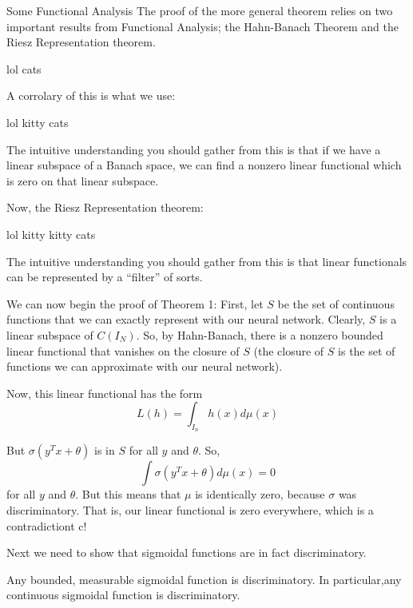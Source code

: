 \documentclass[11pt,letterpaper]{beamer}
\begin{document}
\begin{frame}{Some Functional Analysis}
  The proof of the more general theorem relies on two important results from
  Functional Analysis; the Hahn-Banach Theorem and the Riesz Representation
  theorem.

  \begin{theorem}
    lol cats 
  \end{theorem}
  A corrolary of this is what we use:

  \begin{theorem}
    lol kitty cats
  \end{theorem}

  The intuitive understanding you should gather from this is that if we have a
  linear subspace of a Banach space, we can find a nonzero linear functional which is
  zero on that linear subspace.
\end{frame}

\begin{frame}
  Now, the Riesz Representation theorem:
  \begin{theorem}
    lol kitty kitty cats
  \end{theorem}
 The intuitive understanding you should gather from this is that linear
 functionals can be represented by a ``filter'' of sorts. 
\end{frame}

\begin{frame}
  We can now begin the proof of Theorem 1:
  First, let $S$ be the set of continuous functions that we can exactly
  represent with our neural network. Clearly, $S$ is a linear subspace of
  $C(I_N)$. So, by Hahn-Banach, there is a nonzero bounded linear functional
  that vanishes on the closure of $S$ (the closure of $S$ is the set of
  functions we can approximate with our neural network). 
\end{frame}

\begin{frame}
  Now, this linear functional has the form
  \[
L(h) = \int_{I_n} h(x) d\mu(x)
\]

But $\sigma(y^T x + \theta)$ is in $S$ for all $y$ and $\theta$. So,
\[
\int \sigma(y^Tx + \theta) d \mu(x) = 0
\]
 for all $y$ and $\theta$. But this means that $\mu$ is identically zero,
 because $\sigma$ was discriminatory. That is, our linear functional is zero
 everywhere, which is a contradictiont c!
\end{frame}

\begin{frame}
  Next we need to show that sigmoidal functions are in fact discriminatory.
  \begin{lemma}
    Any bounded, measurable sigmoidal function is discriminatory. In
    particular,any continuous sigmoidal function is discriminatory.
  \end{lemma}
\end{frame}
\end{document}
